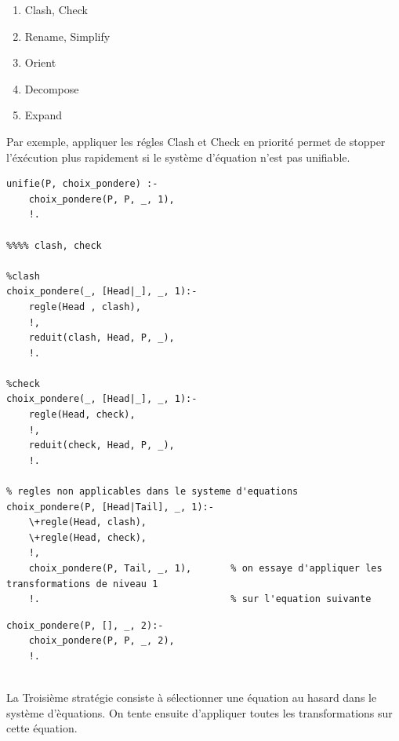 \documentclass[10pt,a4paper]{report}
\begin{document}
\begin{enumerate}
  \item Clash, Check
  \item Rename, Simplify
  \item Orient
  \item Decompose
  \item Expand
\end{enumerate}
Par exemple, appliquer les régles Clash et Check en priorité permet de stopper l'éxécution plus rapidement si le système d'équation n'est pas unifiable.



\begin{lstlisting}[caption ={Stratégie choix pondere dans $main.pl$ avec les régles de poids 1}]
% unification choix pondere
unifie(P, choix_pondere) :-
	choix_pondere(P, P, _, 1),
	!.
	
%%%% clash, check

%clash
choix_pondere(_, [Head|_], _, 1):-
	regle(Head , clash),
	!,
 	reduit(clash, Head, P, _),
	!.

%check
choix_pondere(_, [Head|_], _, 1):-
	regle(Head, check),
	!,
	reduit(check, Head, P, _),
	!.

% regles non applicables dans le systeme d'equations
choix_pondere(P, [Head|Tail], _, 1):-
	\+regle(Head, clash),
	\+regle(Head, check),
	!,
	choix_pondere(P, Tail, _, 1),		% on essaye d'appliquer les transformations de niveau 1
	!.									% sur l'equation suivante

\end{lstlisting}

\begin{lstlisting}[caption ={Stratégie choix pondere dans $main.pl$, passage aux régles de poids 1 }]
choix_pondere(P, [], _, 2):-
	choix_pondere(P, P, _, 2),
	!.
\end{lstlisting}~\\



La Troisième stratégie consiste à sélectionner une équation au hasard dans le système d'èquations. On tente ensuite d'appliquer toutes les transformations sur cette équation.
\end{document}
